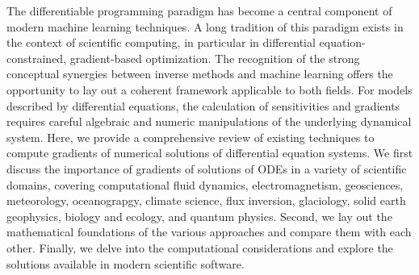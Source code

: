 The differentiable programming paradigm has become a central component of modern machine learning techniques. 
A long tradition of this paradigm exists in the context of scientific computing, in particular in differential equation-constrained, gradient-based optimization.
The recognition of the strong conceptual synergies between inverse methods and machine learning offers the opportunity to lay out a coherent framework applicable to both fields.
For models described by differential equations, the calculation of sensitivities and gradients requires careful algebraic and numeric manipulations of the underlying dynamical system.
Here, we provide a comprehensive review of existing techniques to compute gradients of numerical solutions of differential equation systems.
We first discuss the importance of gradients of solutions of ODEs in a variety of scientific domains, covering computational fluid dynamics, electromagnetism, geosciences, meteorology, oceanograpgy, climate science, flux inversion, glaciology, solid earth geophysics, biology and ecology, and quantum physics.
Second, we lay out the mathematical foundations of the various approaches and compare them with each other. 
Finally, we delve into the computational considerations and explore the solutions available in modern scientific software. 